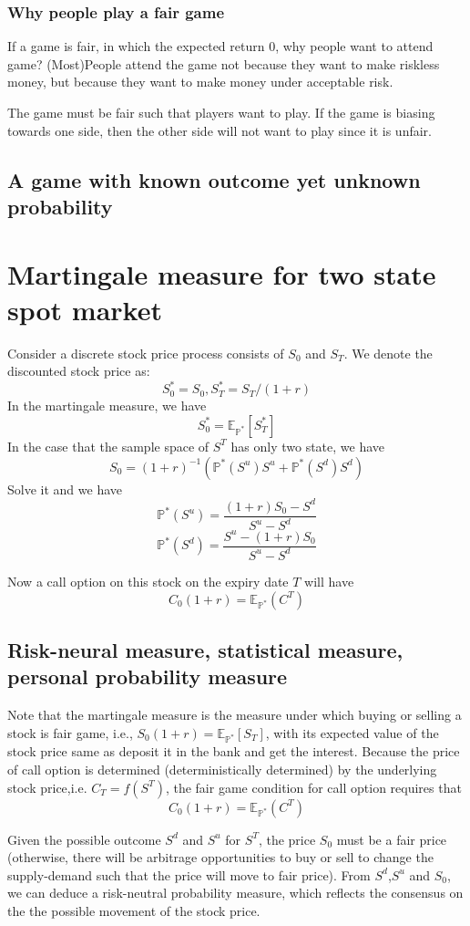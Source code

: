 \documentclass[a4paper,13pt]{report}
\newcommand{\E}{\mathbb{E}}
\newcommand{\PP}{\mathbb{P}}
\begin{document}
\subsubsection{Why people play a fair game}
If a game is fair, in which the expected return 0, why people want to attend game? (Most)People attend the game not because they want to make riskless money, but because they want to make money under acceptable risk.

The game must be fair such that players want to play. If the game is biasing towards one side, then the other side will not want to play since it is unfair.


\subsection{A game with known outcome yet unknown probability}


\section{Martingale measure for two state spot market}
Consider a discrete stock price process consists of $S_0$ and $S_T$. We denote the discounted stock price as:
$$S^*_0 = S_0,S^*_T = S_T/(1+r)$$
In the martingale measure, we have $$S_0^*=\E_{\PP^*}[S^*_T]$$
In the case that the sample space of $S^T$ has only two state, we have \cite{musiela2006martingale}
$$S_0 = (1+r)^{-1}(\PP^*(S^u)S^u+\PP^*(S^d)S^d)$$
Solve it and we have
$$\PP^*(S^u)=\frac{(1+r)S_0-S^d}{S^u-S^d}$$
$$\PP^*(S^d)=\frac{S^u-(1+r)S_0}{S^u-S^d}$$

Now a call option on this stock on the expiry date $T$ will have
$$C_0(1+r) = \E_{\PP^*}(C^T)$$

\subsection{Risk-neural measure, statistical measure, personal probability measure}

Note that the martingale measure is the measure under which buying or selling a stock is fair game, i.e., $S_0(1+r)=\E_{\PP^*}[S_T]$, with its expected value of the stock price same as deposit it in the bank and get the interest. Because the price of call option is determined (deterministically determined) by the underlying stock price,i.e. $C_T = f(S^T)$, the fair game condition for call option requires that $$C_0(1+r) = \E_{\PP^*}(C^T)$$ 

Given the possible outcome $S^d$ and $S^u$ for $S^T$, the price $S_0$ must be a fair price (otherwise, there will be arbitrage opportunities to buy or sell to change the supply-demand such that the price will move to fair price). From $S^d$,$S^u$ and $S_0$, we can deduce a risk-neutral probability measure, which reflects the consensus on the the possible movement of the stock price. 
\end{document}
